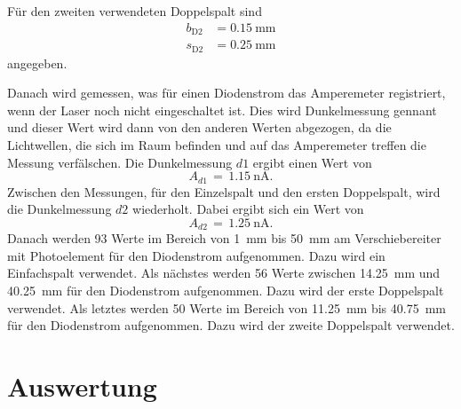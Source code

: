 \documentclass[
  bibliography=totoc,     %
  captions=tableheading,  %
  titlepage=firstiscover, %
]{scrartcl}
\begin{document}
\noindent
Für den zweiten verwendeten Doppelspalt sind
\begin{align*}
  b_\mathup{D2} &= \SI{0.15}{\milli\metre}\\
  s_\mathup{D2} &= \SI{0.25}{\milli\metre}
\end{align*}
angegeben.

\noindent
Danach wird gemessen, was für einen Diodenstrom das Amperemeter registriert, wenn der Laser noch nicht eingeschaltet ist. Dies wird Dunkelmessung gennant und dieser Wert wird dann von den anderen Werten abgezogen, da die Lichtwellen, die sich im Raum befinden und auf das Amperemeter treffen die Messung verfälschen.
Die Dunkelmessung $d1$ ergibt einen Wert von
\begin{equation*}
  A_{d1}\,=\,\SI{1.15}{\nano\ampere}.
\end{equation*}
Zwischen den Messungen, für den Einzelspalt und den ersten Doppelspalt, wird die Dunkelmessung $d2$ wiederholt.
Dabei ergibt sich ein Wert von
\begin{equation*}
  A_{d2}\,=\,\SI{1.25}{\nano\ampere}.
\end{equation*}
Danach werden 93 Werte im Bereich von \SI{1}{\milli\metre} bis \SI{50}{\milli\metre} am Verschiebereiter mit Photoelement für den Diodenstrom aufgenommen. Dazu wird ein Einfachspalt verwendet.
Als nächstes werden 56 Werte zwischen \SI{14.25}{\milli\metre} und \SI{40.25}{\milli\metre} für den Diodenstrom aufgenommen. Dazu wird der erste Doppelspalt verwendet.
Als letztes werden 50 Werte im Bereich von \SI{11.25}{\milli\metre} bis \SI{40.75}{\milli\metre} für den Diodenstrom aufgenommen. Dazu wird der zweite Doppelspalt verwendet.
\clearpage
\section{Auswertung}
\label{sec:auswertung}
\end{document}
